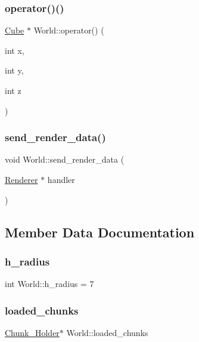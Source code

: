 \subsubsection{\texorpdfstring{operator()()}{operator()()}}
{\footnotesize\ttfamily \mbox{\hyperlink{classCube}{Cube}} $\ast$ World\+::operator() (\begin{DoxyParamCaption}\item[{int}]{x,  }\item[{int}]{y,  }\item[{int}]{z }\end{DoxyParamCaption})}

\mbox{\label{classWorld_af79323774823279380a7db9d61ed8028}} 
\subsubsection{\texorpdfstring{send\+\_\+render\+\_\+data()}{send\_render\_data()}}
{\footnotesize\ttfamily void World\+::send\+\_\+render\+\_\+data (\begin{DoxyParamCaption}\item[{\mbox{\hyperlink{classRenderer}{Renderer}} $\ast$}]{handler }\end{DoxyParamCaption})}



\subsection{Member Data Documentation}
\mbox{\label{classWorld_aeb621b5ca0eba8ee3d0a1d2bfa11b278}} 
\subsubsection{\texorpdfstring{h\+\_\+radius}{h\_radius}}
{\footnotesize\ttfamily int World\+::h\+\_\+radius = 7}

\mbox{\label{classWorld_a712003d390612b1c123013db8dcabc75}} 
\subsubsection{\texorpdfstring{loaded\+\_\+chunks}{loaded\_chunks}}
{\footnotesize\ttfamily \mbox{\hyperlink{classChunk__Holder}{Chunk\+\_\+\+Holder}}$\ast$ World\+::loaded\+\_\+chunks\hspace{0.3cm}{\ttfamily [private]}}

